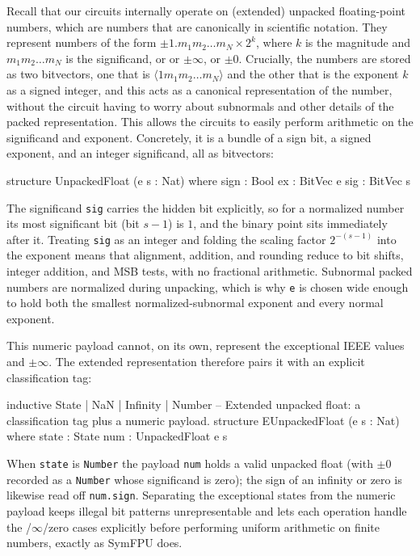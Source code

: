 Recall that our circuits internally operate on (extended) unpacked floating-point numbers,
which are numbers that are canonically in scientific notation.
They represent numbers of the form $\pm 1.m_1m_2 \dots m_N \times 2^{k}$, where $k$ is the magnitude and $m_1 m_2 \dots m_N$ is the significand,
or \nan{} or $\pm\infty$, or $\pm 0$.
Crucially, the numbers are stored as two bitvectors, one that is $\langle 1 m_1 m_2 \dots m_N \rangle$ and the other that is the exponent $k$ as a signed integer,
and this acts as a canonical representation of the number, without the circuit having to worry about subnormals and other details of the packed representation.
This allows the circuits to easily perform arithmetic on the significand and exponent.
Concretely, it is a bundle of a sign bit, a signed exponent, and an integer significand, all as bitvectors:
\begin{lean4}[fontsize=\small]
structure UnpackedFloat (e s : Nat) where
  sign : Bool    ex : BitVec e    sig : BitVec s
\end{lean4}
\noindent The significand \texttt{sig} carries the hidden bit explicitly, so for a normalized number its most significant bit (bit $s-1$) is $1$, and the binary point sits immediately after it.
Treating \texttt{sig} as an integer and folding the scaling factor $2^{-(s-1)}$ into the exponent means that alignment, addition, and rounding reduce to bit shifts, integer addition, and MSB tests, with no fractional arithmetic.
Subnormal packed numbers are normalized during unpacking, which is why \texttt{e} is chosen wide enough to hold both the smallest normalized-subnormal exponent and every normal exponent.

This numeric payload cannot, on its own, represent the exceptional IEEE values \nan{} and $\pm\infty$. The extended representation therefore pairs it with an explicit classification tag:
\begin{lean4}[fontsize=\small]
inductive State | NaN | Infinity | Number
-- Extended unpacked float: a classification tag plus a numeric payload.
structure EUnpackedFloat (e s : Nat) where
  state : State    num : UnpackedFloat e s
\end{lean4}
\noindent When \texttt{state} is \texttt{Number} the payload \texttt{num} holds a valid unpacked float (with $\pm 0$ recorded as a \texttt{Number} whose significand is zero); the sign of an infinity or zero is likewise read off \texttt{num.sign}.
Separating the exceptional states from the numeric payload keeps illegal bit patterns unrepresentable and lets each operation handle the \nan{}/$\infty$/zero cases explicitly before performing uniform arithmetic on finite numbers, exactly as SymFPU does.

